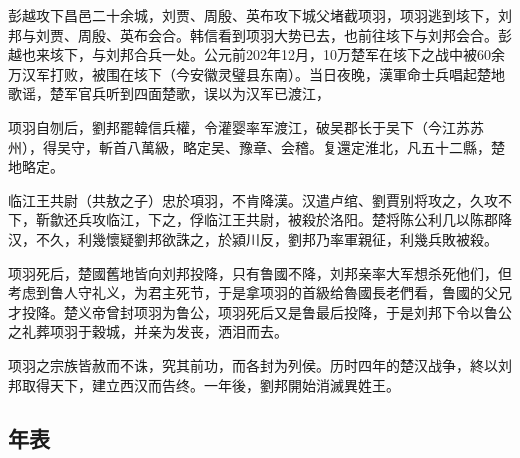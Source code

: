 彭越攻下昌邑二十余城，刘贾、周殷、英布攻下城父堵截项羽，项羽逃到垓下，刘邦与刘贾、周殷、英布会合。韩信看到项羽大势已去，也前往垓下与刘邦会合。彭越也来垓下，与刘邦合兵一处。公元前202年12月，10万楚军在垓下之战中被60余万汉军打败，被围在垓下（今安徽灵璧县东南）。当日夜晚，漢軍命士兵唱起楚地歌谣，楚军官兵听到四面楚歌，误以为汉军已渡江，

项羽自刎后，劉邦罷韓信兵權，令灌婴率军渡江，破吴郡长于吴下（今江苏苏州），得吴守，斬首八萬級，略定吴、豫章、会稽。复還定淮北，凡五十二縣，楚地略定。

临江王共尉（共敖之子）忠於項羽，不肯降漢。汉遣卢绾、劉賈别将攻之，久攻不下，靳歙还兵攻临江，下之，俘临江王共尉，被殺於洛阳。楚将陈公利几以陈郡降汉，不久，利幾懷疑劉邦欲誅之，於潁川反，劉邦乃率軍親征，利幾兵敗被殺。

项羽死后，楚國舊地皆向刘邦投降，只有鲁國不降，刘邦亲率大军想杀死他们，但考虑到鲁人守礼义，为君主死节，于是拿项羽的首級给魯國長老們看，鲁國的父兄才投降。楚义帝曾封项羽为鲁公，项羽死后又是鲁最后投降，于是刘邦下令以鲁公之礼葬项羽于穀城，并亲为发丧，洒泪而去。

项羽之宗族皆赦而不诛，究其前功，而各封为列侯。历时四年的楚汉战争，終以刘邦取得天下，建立西汉而告终。一年後，劉邦開始消滅異姓王。

\subsection{年表}



